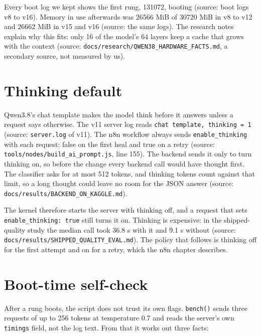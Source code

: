 \documentclass[11pt,a4paper]{report}
\begin{document}
Every boot log we kept shows the first rung, 131072, booting (source: boot logs v8 to v16). Memory in use afterwards was 26566 MiB of 30720 MiB in v8 to v12 and 26662 MiB in v15 and v16 (source: the same logs). The research notes explain why this fits: only 16 of the model's 64 layers keep a cache that grows with the context (source: \texttt{docs/\allowbreak{}research/\allowbreak{}QWEN38\_\allowbreak{}HARDWARE\_\allowbreak{}FACTS.\allowbreak{}md}, a secondary source, not measured by us).

\section{Thinking default}

Qwen3.8's chat template makes the model think before it answers unless a request says otherwise. The v11 server log reads \texttt{chat template, thinking = 1} (source: \texttt{server.\allowbreak{}log} of v11). The n8n workflow always sends \texttt{enable\_\allowbreak{}thinking} with each request: false on the first heal and true on a retry (source: \texttt{tools/\allowbreak{}nodes/\allowbreak{}build\_\allowbreak{}ai\_\allowbreak{}prompt.\allowbreak{}js}, line 155). The backend sends it only to turn thinking on, so before the change every backend call would have thought first. The classifier asks for at most 512 tokens, and thinking tokens count against that limit, so a long thought could leave no room for the JSON answer (source: \texttt{docs/\allowbreak{}results/\allowbreak{}BACKEND\_\allowbreak{}ON\_\allowbreak{}KAGGLE.\allowbreak{}md}).

The kernel therefore starts the server with thinking off, and a request that sets \texttt{enable\_\allowbreak{}thinking: true} still turns it on. Thinking is expensive: in the shipped-quality study the median call took 36.8 s with it and 9.1 s without (source: \texttt{docs/\allowbreak{}results/\allowbreak{}SHIPPED\_\allowbreak{}QUALITY\_\allowbreak{}EVAL.\allowbreak{}md}). The policy that follows is thinking off for the first attempt and on for a retry, which the n8n chapter describes.

\section{Boot-time self-check}

After a rung boots, the script does not trust its own flags. \texttt{bench()} sends three requests of up to 256 tokens at temperature 0.7 and reads the server's own \texttt{timings} field, not the log text. From that it works out three facts:
\end{document}
